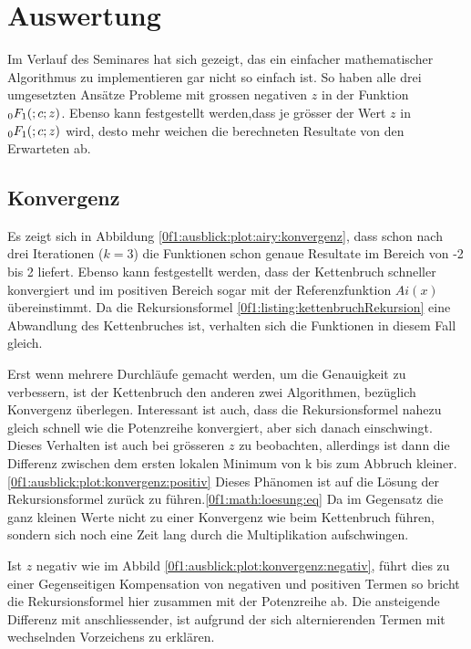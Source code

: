 %
%
%
\section{Auswertung
\label{0f1:section:teil3}}
Im Verlauf des Seminares hat sich gezeigt, 
das ein einfacher mathematischer Algorithmus zu implementieren gar nicht so einfach ist.
So haben alle drei umgesetzten Ansätze Probleme mit grossen negativen $z$ in der Funktion $\mathstrut_0F_1(;c;z)$.
Ebenso kann festgestellt werden,dass je grösser der Wert $z$ in $\mathstrut_0F_1(;c;z)$ wird, desto mehr weichen die berechneten Resultate von den Erwarteten ab. \cite{0f1:wolfram-0f1}

\subsection{Konvergenz
\label{0f1:subsection:konvergenz}}
Es zeigt sich in Abbildung \ref{0f1:ausblick:plot:airy:konvergenz}, dass schon nach drei Iterationen ($k = 3$) die Funktionen schon genaue Resultate im Bereich von -2 bis 2 liefert. Ebenso kann festgestellt werden, dass der Kettenbruch schneller konvergiert und im positiven Bereich sogar mit der Referenzfunktion $Ai(x)$ übereinstimmt. Da die Rekursionsformel \ref{0f1:listing:kettenbruchRekursion} eine Abwandlung des Kettenbruches ist, verhalten sich die Funktionen in diesem Fall gleich.

Erst wenn mehrere Durchläufe gemacht werden, um die Genauigkeit zu verbessern, ist der Kettenbruch den anderen zwei Algorithmen, bezüglich Konvergenz überlegen. 
Interessant ist auch, dass die Rekursionsformel nahezu gleich schnell wie die Potenzreihe konvergiert, aber sich danach einschwingt. Dieses Verhalten ist auch bei grösseren $z$ zu beobachten, allerdings ist dann die Differenz zwischen dem ersten lokalen Minimum von k bis zum Abbruch kleiner.
\ref{0f1:ausblick:plot:konvergenz:positiv}
Dieses Phänomen ist auf die Lösung der Rekursionsformel zurück zu führen.\ref{0f1:math:loesung:eq} Da im Gegensatz die ganz kleinen Werte nicht zu einer Konvergenz wie beim Kettenbruch führen, sondern sich noch eine Zeit lang durch die Multiplikation aufschwingen.

Ist $z$ negativ wie im Abbild \ref{0f1:ausblick:plot:konvergenz:negativ}, führt dies zu einer Gegenseitigen Kompensation von negativen und positiven Termen so bricht die Rekursionsformel hier zusammen mit der Potenzreihe ab.
Die ansteigende Differenz mit anschliessender, ist aufgrund der sich alternierenden Termen mit wechselnden Vorzeichens zu erklären.

